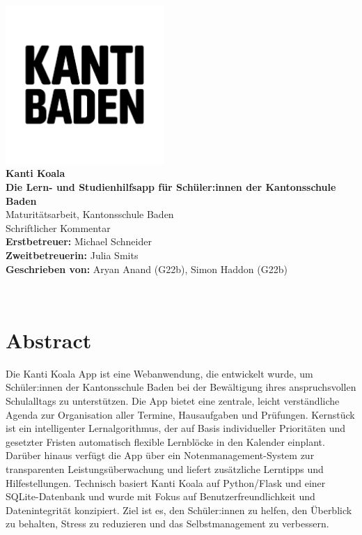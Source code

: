\documentclass[12pt,a4paper]{report}
\begin{document}
\makeatletter
\begin{titlepage}
    \centering
    \vspace*{1cm}
       { \includegraphics[width=6cm]{img/kanti-baden.png}}\\[1cm]

    {\LARGE \textbf{Kanti Koala}}\\
    {\textbf{Die Lern- und Studienhilfsapp für Schüler:innen der Kantonsschule Baden}}\\[1cm]

    {Maturitätsarbeit, Kantonsschule Baden}\\
    {Schriftlicher Kommentar}\\[1cm]
    
    \textbf{Erstbetreuer: }{Michael Schneider}\\
    \textbf{Zweitbetreuerin: }{Julia Smits}\\[1cm]
    
    \textbf{Geschrieben von: }{Aryan Anand (G22b), Simon Haddon (G22b)}\\[1cm]
    \date{\large Datum: 11. November 2025}
    {\@date\\}
\end{titlepage}
\makeatother

\chapter*{Abstract}
Die Kanti Koala App ist eine Webanwendung, die entwickelt wurde, um Schüler:innen der Kantonsschule Baden bei der Bewältigung ihres anspruchsvollen Schulalltags zu unterstützen. Die App bietet eine zentrale, leicht verständliche Agenda zur Organisation aller Termine, Hausaufgaben und Prüfungen. Kernstück ist ein intelligenter Lernalgorithmus, der auf Basis individueller Prioritäten und gesetzter Fristen automatisch flexible Lernblöcke in den Kalender einplant. Darüber hinaus verfügt die App über ein Notenmanagement-System zur transparenten Leistungsüberwachung und liefert zusätzliche Lerntipps und Hilfestellungen. Technisch basiert Kanti Koala auf Python/Flask und einer SQLite-Datenbank und wurde mit Fokus auf Benutzerfreundlichkeit und Datenintegrität konzipiert. Ziel ist es, den Schüler:innen zu helfen, den Überblick zu behalten, Stress zu reduzieren und das Selbstmanagement zu verbessern.
\end{document}
